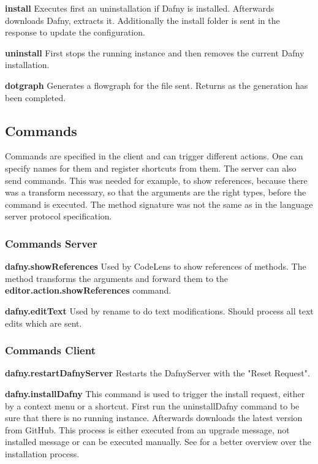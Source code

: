 \textbf{install}
Executes first an uninstallation if Dafny is installed. Afterwards downloads Dafny, extracts it. Additionally the install folder is sent in the response to update the configuration. \newline

\textbf{uninstall}
First stops the running instance and then removes the current Dafny installation. \newline

\textbf{dotgraph}
Generates a flowgraph for the file sent. Returns as the generation has been completed. \newline

\subsection{Commands}
Commands are specified in the client and can trigger different actions. One can specify names for them and register shortcuts from them. The server can also send commands. This was needed for example, to show references, because there was a transform necessary, so that the arguments are the right types, before the command is executed. The method signature was not the same as in the language server protocol specification. 

\subsubsection{Commands Server}
\textbf{dafny.showReferences}
Used by CodeLens to show references of methods. The method transforms the arguments and forward them to the \textbf{editor.action.showReferences} command. 

\textbf{dafny.editText}
Used by rename to do text modifications. Should process all text edits which are sent. 

\subsubsection{Commands Client}

\textbf{dafny.restartDafnyServer}
Restarts the DafnyServer with the "Reset Request".\newline

\textbf{dafny.installDafny}
This command is used to trigger the install request, either by a context menu or a shortcut. 
First run the uninstallDafny command to be sure that there is no running instance. Afterwards downloads the latest version from GitHub. This process is either executed from an upgrade message, not installed message or can be executed manually. 
See  for a better overview over the installation process. \newline

